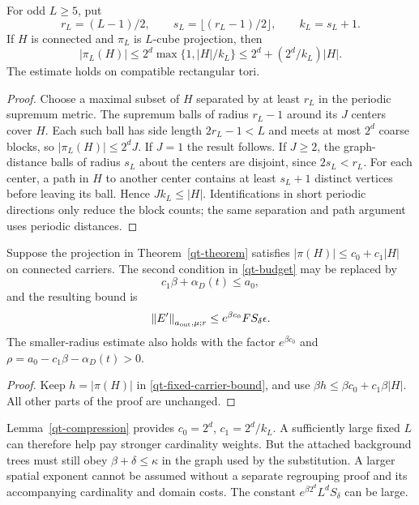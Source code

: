 \begin{lemma}\label{qt-compression}
For odd $L\ge5$, put
\begin{equation}\label{qt-compression-constants}
 r_L=(L-1)/2,\qquad s_L=\lfloor(r_L-1)/2\rfloor,
 \qquad k_L=s_L+1.
\end{equation}
If $H$ is connected and $\pi_L$ is $L$-cube projection, then
\begin{equation}\label{qt-compression-bound}
 |\pi_L(H)|\le2^d\max\{1,|H|/k_L\}
           \le2^d+(2^d/k_L)|H|.
\end{equation}
The estimate holds on compatible rectangular tori.
\end{lemma}
\begin{proof}
Choose a maximal subset of $H$ separated by at least $r_L$ in
the periodic supremum metric. The supremum balls of radius
$r_L-1$ around its $J$ centers cover $H$. Each such ball has
side length $2r_L-1<L$ and meets at most $2^d$ coarse blocks,
so $|\pi_L(H)|\le2^d J$. If $J=1$ the result follows.
If $J\ge2$, the graph-distance balls of radius $s_L$ about
the centers are disjoint, since $2s_L<r_L$. For each center,
a path in $H$ to another center contains at least $s_L+1$
distinct vertices before leaving its ball. Hence
$Jk_L\le|H|$. Identifications in short periodic directions
only reduce the block counts; the same separation and path
argument uses periodic distances.
\end{proof}

\begin{corollary}\label{qt-compressed-transport}
Suppose the projection in Theorem~\ref{qt-theorem} satisfies
$|\pi(H)|\le c_0+c_1|H|$ on connected carriers. The second
condition in \eqref{qt-budget} may be replaced by
\begin{equation}\label{qt-compressed-budget}
 c_1\beta+\alpha_D(t)\le a_0,
\end{equation}
and the resulting bound is
\begin{equation}\label{qt-compressed-bound}
 \left\|E'\right\|_{a_{\mathrm{out}},\mu;r}
       \le e^{\beta c_0}F S_\delta\epsilon.
\end{equation}
The smaller-radius estimate also holds with the factor
$e^{\beta c_0}$ and
$\rho=a_0-c_1\beta-\alpha_D(t)>0$.
\end{corollary}
\begin{proof}
Keep $h=|\pi(H)|$ in \eqref{qt-fixed-carrier-bound}, and
use $\beta h\le\beta c_0+c_1\beta |H|$. All other parts
of the proof are unchanged.
\end{proof}
Lemma~\ref{qt-compression} provides
$c_0=2^d$, $c_1=2^d/k_L$. A sufficiently large fixed $L$
can therefore help pay stronger cardinality weights. But the
attached background trees must still obey
$\beta+\delta\le\kappa$ in the graph used by the substitution.
A larger spatial exponent cannot be assumed without a separate
regrouping proof and its accompanying cardinality and domain costs.
The constant $e^{\beta2^d}L^d S_\delta$ can be large.


